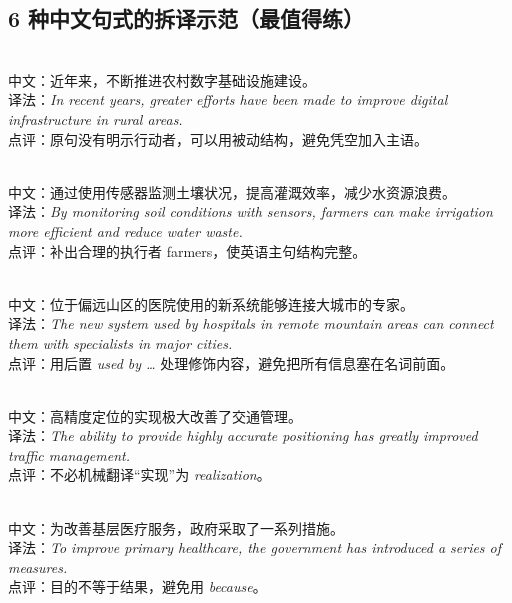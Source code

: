 \documentclass[a4paper,11pt,UTF8,fontset=none]{ctexart}
\begin{document}
\subsection{6 种中文句式的拆译示范（最值得练）}

\\ 中文：近年来，不断推进农村数字基础设施建设。\\ 译法：{\itshape In recent years, greater efforts have been made to improve digital infrastructure in rural areas.}\\ 点评：原句没有明示行动者，可以用被动结构，避免凭空加入主语。\par

\\ 中文：通过使用传感器监测土壤状况，提高灌溉效率，减少水资源浪费。\\ 译法：{\itshape By monitoring soil conditions with sensors, farmers can make irrigation more efficient and reduce water waste.}\\ 点评：补出合理的执行者 farmers，使英语主句结构完整。\par

\\ 中文：位于偏远山区的医院使用的新系统能够连接大城市的专家。\\ 译法：{\itshape The new system used by hospitals in remote mountain areas can connect them with specialists in major cities.}\\ 点评：用后置 {\itshape used by …} 处理修饰内容，避免把所有信息塞在名词前面。\par

\\ 中文：高精度定位的实现极大改善了交通管理。\\ 译法：{\itshape The ability to provide highly accurate positioning has greatly improved traffic management.}\\ 点评：不必机械翻译“实现”为 {\itshape realization}。\par

\\ 中文：为改善基层医疗服务，政府采取了一系列措施。\\ 译法：{\itshape To improve primary healthcare, the government has introduced a series of measures.}\\ 点评：目的不等于结果，避免用 {\itshape because}。\par
\end{document}
